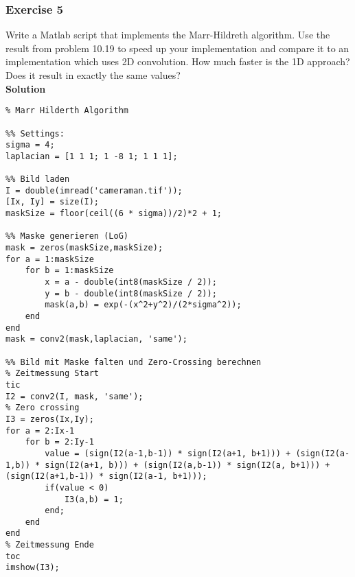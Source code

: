 \subsubsection{Exercise 5}
Write a Matlab script that implements the Marr-Hildreth algorithm. 
Use the result from problem 10.19 to speed up your implementation and compare it to an implementation which  uses 2D convolution.
How much faster is the 1D approach? Does it result in exactly the same values?\\
\textbf{Solution}

\begin{lstlisting}
% Marr Hilderth Algorithm

%% Settings:
sigma = 4;
laplacian = [1 1 1; 1 -8 1; 1 1 1];

%% Bild laden
I = double(imread('cameraman.tif'));
[Ix, Iy] = size(I);
maskSize = floor(ceil((6 * sigma))/2)*2 + 1;

%% Maske generieren (LoG)
mask = zeros(maskSize,maskSize);
for a = 1:maskSize
    for b = 1:maskSize
        x = a - double(int8(maskSize / 2));
        y = b - double(int8(maskSize / 2));
        mask(a,b) = exp(-(x^2+y^2)/(2*sigma^2));
    end
end
mask = conv2(mask,laplacian, 'same');

%% Bild mit Maske falten und Zero-Crossing berechnen
% Zeitmessung Start
tic
I2 = conv2(I, mask, 'same');
% Zero crossing
I3 = zeros(Ix,Iy);
for a = 2:Ix-1
    for b = 2:Iy-1
        value = (sign(I2(a-1,b-1)) * sign(I2(a+1, b+1))) + (sign(I2(a-1,b)) * sign(I2(a+1, b))) + (sign(I2(a,b-1)) * sign(I2(a, b+1))) + (sign(I2(a+1,b-1)) * sign(I2(a-1, b+1)));
        if(value < 0)
            I3(a,b) = 1;
        end;        
    end
end
% Zeitmessung Ende
toc
imshow(I3);
\end{lstlisting}
